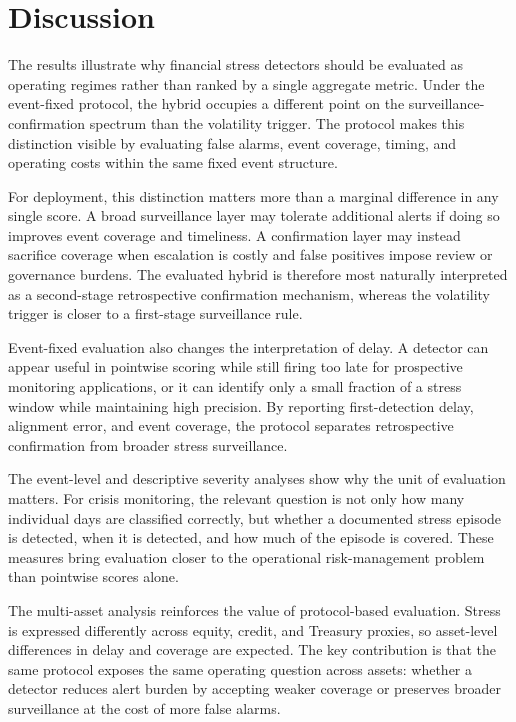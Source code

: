 \documentclass[10pt,twocolumn]{article}
\begin{document}
\section{Discussion}
The results illustrate why financial stress detectors should be evaluated as operating regimes rather than ranked by a single aggregate metric. Under the event-fixed protocol, the hybrid occupies a different point on the surveillance-confirmation spectrum than the volatility trigger. The protocol makes this distinction visible by evaluating false alarms, event coverage, timing, and operating costs within the same fixed event structure.

For deployment, this distinction matters more than a marginal difference in any single score. A broad surveillance layer may tolerate additional alerts if doing so improves event coverage and timeliness. A confirmation layer may instead sacrifice coverage when escalation is costly and false positives impose review or governance burdens. The evaluated hybrid is therefore most naturally interpreted as a second-stage retrospective confirmation mechanism, whereas the volatility trigger is closer to a first-stage surveillance rule.

Event-fixed evaluation also changes the interpretation of delay. A detector can appear useful in pointwise scoring while still firing too late for prospective monitoring applications, or it can identify only a small fraction of a stress window while maintaining high precision. By reporting first-detection delay, alignment error, and event coverage, the protocol separates retrospective confirmation from broader stress surveillance.

The event-level and descriptive severity analyses show why the unit of evaluation matters. For crisis monitoring, the relevant question is not only how many individual days are classified correctly, but whether a documented stress episode is detected, when it is detected, and how much of the episode is covered. These measures bring evaluation closer to the operational risk-management problem than pointwise scores alone.

The multi-asset analysis reinforces the value of protocol-based evaluation. Stress is expressed differently across equity, credit, and Treasury proxies, so asset-level differences in delay and coverage are expected. The key contribution is that the same protocol exposes the same operating question across assets: whether a detector reduces alert burden by accepting weaker coverage or preserves broader surveillance at the cost of more false alarms.
\end{document}
